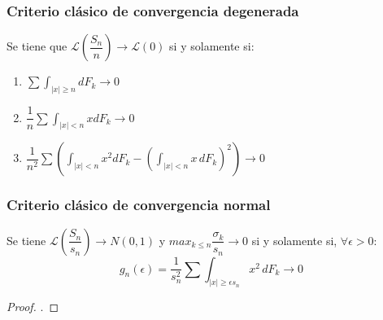 \documentclass[12pt,a4paper]{book}
\begin{document}
\subsubsection{Criterio clásico de convergencia degenerada}
Se tiene que $\mathcal{L} \left( \dfrac{S_n}{n} \right)\rightarrow \mathcal{L}(0)$ si y solamente si:
\begin{enumerate}
\item $\sum\displaystyle\int_{|x|\geq n}dF_k \rightarrow 0$
\item $\dfrac{1}{n}\sum\displaystyle\int_{|x|<n} x dF_k \rightarrow 0$
\item $\dfrac{1}{n^2}\sum\left( \displaystyle\int_{|x|<n}x^2 dF_k - \left(  \displaystyle\int_{|x|<n}x\, dF_k \right)^2 \right)\longrightarrow 0$
\end{enumerate}
\subsubsection{Criterio clásico de convergencia normal}
Se tiene $\mathcal{L} \left( \dfrac{S_n}{s_n} \right)\rightarrow N(0,1)$ y $max_{k\leq n}\dfrac{\sigma_k}{s_n}\rightarrow 0$ si y solamente si, $\forall \epsilon >0$:
$$g_n(\epsilon)=\dfrac{1}{s_n^2}\sum\int_{|x|\geq \epsilon s_n}x^2\, dF_k\longrightarrow 0$$
\begin{proof}
.
\end{proof}
\end{document}
